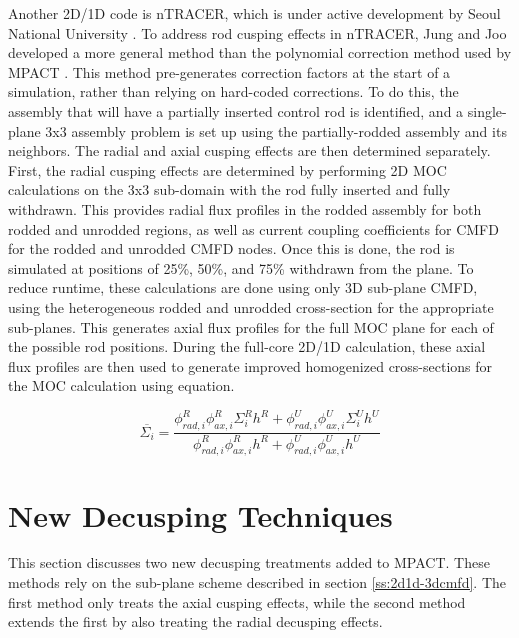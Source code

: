 Another 2D/1D code is nTRACER, which is under active development by Seoul National University \cite{RyuBEAVRSnTRACER2015}.  To address rod cusping effects in nTRACER, Jung and Joo developed a more general method than the polynomial correction method used by MPACT \cite{ICAPPcontrolRodDecuspingNTRACER}.  This method pre-generates correction factors at the start of a simulation, rather than relying on hard-coded corrections.  To do this, the assembly that will have a partially inserted control rod is identified, and a single-plane 3x3 assembly problem is set up using the partially-rodded assembly and its neighbors.  The radial and axial cusping effects are then determined separately.  First, the radial cusping effects are determined by performing 2D MOC calculations on the 3x3 sub-domain with the rod fully inserted and fully withdrawn.  This provides radial flux profiles in the rodded assembly for both rodded and unrodded regions, as well as current coupling coefficients for CMFD for the rodded and unrodded CMFD nodes.  Once this is done, the rod is simulated at positions of 25\%, 50\%, and 75\% withdrawn from the plane.  To reduce runtime, these calculations are done using only 3D sub-plane CMFD, using the heterogeneous rodded and unrodded cross-section for the appropriate sub-planes.  This generates axial flux profiles for the full MOC plane for each of the possible rod positions.  During the full-core 2D/1D calculation, these axial flux profiles are then used to generate improved homogenized cross-sections for the MOC calculation using equation.

\begin{equation}\label{e:nTRACERdecusping}
\overline{\Sigma_i} = \frac{\phi_{rad,i}^R \phi_{ax,i}^R \Sigma_i^R h^R + \phi_{rad,i}^U \phi_{ax,i}^U \Sigma_i^U h^U}{\phi_{rad,i}^R \phi_{ax,i}^R h^R + \phi_{rad,i}^U \phi_{ax,i}^U h^U}
\end{equation}


\section{New Decusping Techniques}

This section discusses two new decusping treatments added to MPACT.  These methods rely on the sub-plane scheme described in section \ref{ss:2d1d-3dcmfd}.  The first method only treats the axial cusping effects, while the second method extends the first by also treating the radial decusping effects.

